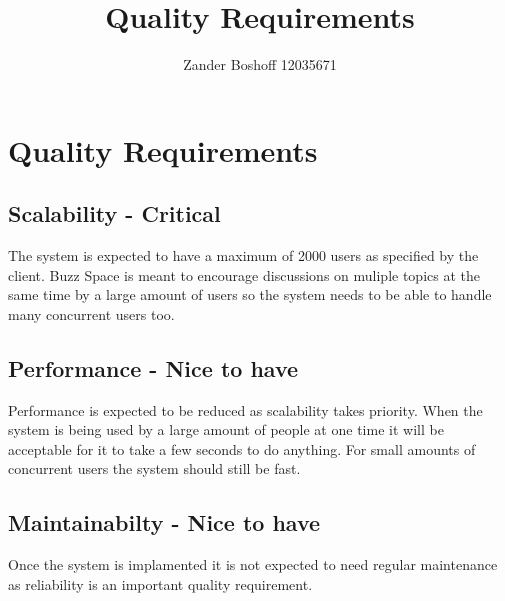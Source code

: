 
\title{Quality Requirements}
\author{Zander Boshoff 12035671}

\section{Quality Requirements}
\subsection{Scalability - Critical}
The system is expected to have a maximum of 2000 users as specified by the client. Buzz Space is meant to encourage discussions on muliple topics at the same time by a large amount of users so the system needs to be able to handle many concurrent users too.

\subsection{Performance - Nice to have}
Performance is expected to be reduced as scalability takes priority. When the system is being used by a large amount of people at one time it will be acceptable for it to take a few seconds to do anything. For small amounts of concurrent users the system should still be fast.

\subsection{Maintainabilty - Nice to have}
Once the system is implamented it is not expected to need regular maintenance as reliability is an important quality requirement.



